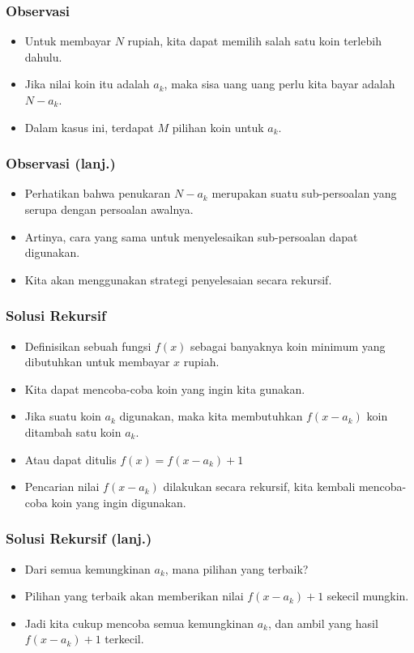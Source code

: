 \begin{frame}
\frametitle{Observasi}
\begin{itemize}
  \item Untuk membayar $N$ rupiah, kita dapat memilih salah satu koin terlebih dahulu.
  \item Jika nilai koin itu adalah $a_k$, maka sisa uang uang perlu kita bayar adalah $N-a_k$.
  \item Dalam kasus ini, terdapat $M$ pilihan koin untuk $a_k$.
\end{itemize}
\end{frame}

\begin{frame}
\frametitle{Observasi (lanj.)}
\begin{itemize}
  \item Perhatikan bahwa penukaran $N - a_k$ merupakan suatu sub-persoalan yang serupa dengan persoalan awalnya.
  \item Artinya, cara yang sama untuk menyelesaikan sub-persoalan dapat digunakan.
  \item Kita akan menggunakan strategi penyelesaian secara rekursif.
\end{itemize}
\end{frame}

\begin{frame}
\frametitle{Solusi Rekursif}
\begin{itemize}
  \item Definisikan sebuah fungsi $f(x)$ sebagai banyaknya koin minimum yang dibutuhkan untuk membayar $x$ rupiah.
  \item Kita dapat mencoba-coba koin yang ingin kita gunakan.
  \item Jika suatu koin $a_k$ digunakan, maka kita membutuhkan $f(x-a_k)$ koin ditambah satu koin $a_k$.
  \item Atau dapat ditulis $f(x) = f(x-a_k) + 1$
  \item Pencarian nilai $f(x-a_k)$ dilakukan secara rekursif, kita kembali mencoba-coba koin yang ingin digunakan.
\end{itemize}
\end{frame}

\begin{frame}
\frametitle{Solusi Rekursif (lanj.)}
\begin{itemize}
  \item Dari semua kemungkinan $a_k$, mana pilihan yang terbaik?
  \item Pilihan yang terbaik akan memberikan nilai $f(x - a_k) + 1$ sekecil mungkin.
  \item Jadi kita cukup mencoba semua kemungkinan $a_k$, dan ambil yang hasil $f(x - a_k) + 1$ terkecil.
\end{itemize}
\end{frame}

